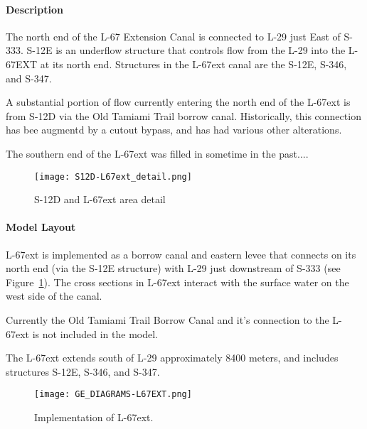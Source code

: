 \paragraph{Description}

The north end of the L-67 Extension Canal is connected to L-29 just East of S-333. S-12E is an underflow structure that controls flow from the L-29 into the L-67EXT at its north end. Structures in the L-67ext canal are the S-12E, S-346, and S-347.

A substantial portion of flow currently entering the north end of the L-67ext is from S-12D via the Old Tamiami Trail borrow canal. Historically, this connection has bee augmentd by a cutout bypass, and has had various other alterations.

The southern end of the L-67ext was filled in sometime in the past....

\begin{figure}[!h]
  \begin{center}
  \texttt{[image: S12D-L67ext\_detail.png]}
  \caption{S-12D and L-67ext area detail}
  \end{center}
\end{figure}


\paragraph{Model Layout}

L-67ext is implemented as a borrow canal and eastern levee that connects on its north end (via the S-12E structure) with L-29 just downstream of S-333 (see Figure~\ref{fig:H_L-67-EXT}). The cross sections in L-67ext interact with the surface water on the west side of the canal.

Currently the Old Tamiami Trail Borrow Canal and it's connection to the L-67ext is not included in the model.

The L-67ext extends south of L-29 approximately 8400 meters, and includes structures S-12E, S-346, and S-347.

\begin{figure}[!ht]
\begin{center}
  \texttt{[image: GE\_DIAGRAMS-L67EXT.png]}
  \caption[Implementation of L-67ext]{Implementation of L-67ext.}
\label{fig:H_L-67-EXT}
\end{center}
\end{figure}


\clearpage

